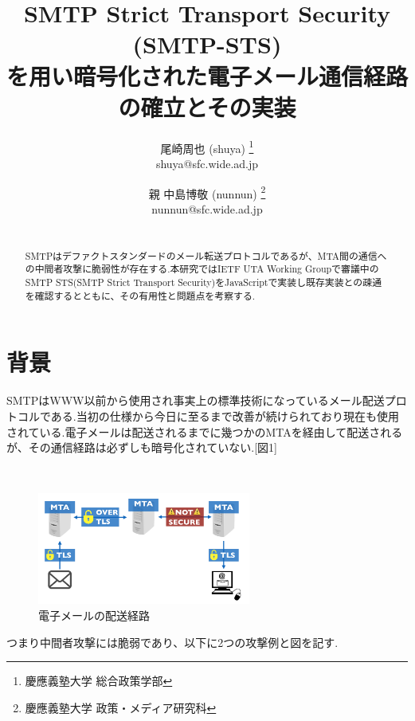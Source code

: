 \documentclass[a4j,10pt]{jsarticle}
\begin{document}

\title{SMTP Strict Transport Security (SMTP-STS)
\\を用い暗号化された電子メール通信経路の確立とその実装}

\author{
    尾崎周也 (shuya) \thanks{慶應義塾大学 総合政策学部}
    \\shuya@sfc.wide.ad.jp
    \and
    親 中島博敬 (nunnun) \thanks{慶應義塾大学 政策・メディア研究科}
    \\nunnun@sfc.wide.ad.jp
}


\begin{abstract}
\\SMTPはデファクトスタンダードのメール転送プロトコルであるが、MTA間の通信への中間者攻撃に脆弱性が存在する.本研究ではIETF UTA Working Groupで審議中のSMTP STS(SMTP Strict Transport Security)をJavaScriptで実装し既存実装との疎通を確認するとともに、その有用性と問題点を考察する.
\end{abstract}

\maketitle
\thispagestyle{empty}

\section{背景}

SMTPはWWW以前から使用され事実上の標準技術になっているメール配送プロトコルである.当初の仕様から今日に至るまで改善が続けられており現在も使用されている.電子メールは配送されるまでに幾つかのMTAを経由して配送されるが、その通信経路は必ずしも暗号化されていない.[図1]
\begin{figure}[htbp]
　\begin{center}
      \includegraphics[width=7cm]{figure1.png}
      \caption{電子メールの配送経路}
    \end{center}
\end{figure}

つまり中間者攻撃には脆弱であり、以下に2つの攻撃例と図を記す.
\end{document}
